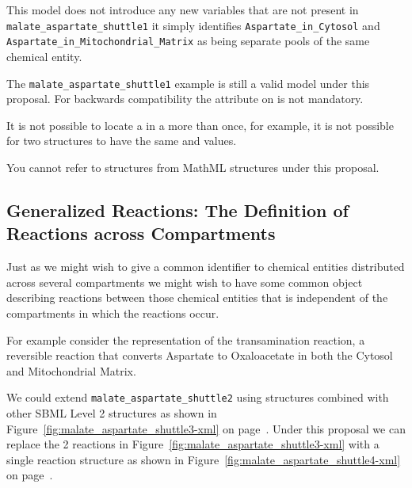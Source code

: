 \documentclass{cekarticle}
\begin{document}
This model does not introduce any new variables that are not present in
\texttt{malate\_aspartate\_shuttle1} it simply identifies \texttt{Aspartate\_in\_Cytosol}
and \texttt{Aspartate\_in\_Mitochondrial\_Matrix} as being separate pools of the same chemical entity.

The \texttt{malate\_aspartate\_shuttle1} example is still a valid model under this proposal.
For backwards compatibility the  attribute on  is not
mandatory.

It is not possible to locate a  in a
 more than once, for example, it is not
possible for two  structures to have the same
 and  values.

You cannot refer to  structures from MathML
structures under this proposal.

\subsection{Generalized Reactions: The Definition of Reactions across Compartments}
\label{sec:commonreaction}

Just as we might wish to give a common identifier to chemical
entities distributed across several compartments we might wish to
have some common object describing reactions between those
chemical entities that is independent of the compartments in which
the reactions occur.

For example consider the representation of the transamination reaction, a reversible reaction
that converts Aspartate to Oxaloacetate in both the Cytosol and Mitochondrial Matrix.

We could extend \texttt{malate\_aspartate\_shuttle2} using
 structures combined with other SBML Level 2
structures as shown in
Figure~\ref{fig:malate_aspartate_shuttle3-xml} on
page~\pageref{fig:malate_aspartate_shuttle3-xml}. Under this
proposal we can replace the 2 reactions in
Figure~\ref{fig:malate_aspartate_shuttle3-xml} with a single
reaction structure as shown in
Figure~\ref{fig:malate_aspartate_shuttle4-xml} on
page~\pageref{fig:malate_aspartate_shuttle4-xml}.
\end{document}
